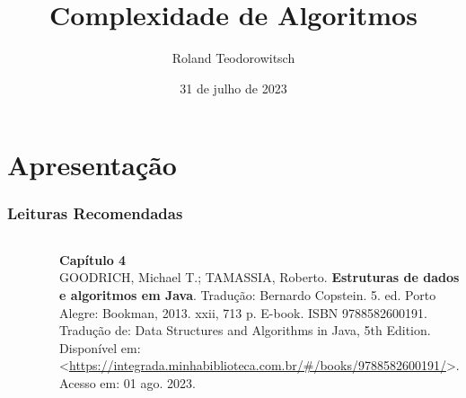 \documentclass[aspectratio=169]{beamer}
\title[\sc{Complexidade de Algoritmos}]{Complexidade de Algoritmos}
\author[Roland Teodorowitsch]{Roland Teodorowitsch}
\institute[ALEST I - EP - PUCRS]{Algoritmos e Estruturas de Dados I - Escola Politécnica - PUCRS}
\date{31 de julho de 2023}
\begin{document}
\justifying

\begin{frame}
	\titlepage
\end{frame}

\section{Apresentação}

\begin{frame}\frametitle{Leituras Recomendadas}

\begin{columns}[T]
\begin{column}{0.15\linewidth}
\vspace{-3mm}
\begin{figure}[h]
	\centering
	\includegraphics[height=0.3\paperheight]{pucrs-ec-poo-unidade_01-complexidade_de_algoritmos-laminas-livro_goodrich.jpg}
\end{figure}
\end{column}
\begin{column}{0.85\linewidth}
\vspace{3mm}
\textbf{Capítulo 4}\\
\scriptsize{GOODRICH, Michael T.; TAMASSIA, Roberto. \textbf{Estruturas de dados e algoritmos em Java}. Tradução: Bernardo Copstein. 5. ed. Porto Alegre: Bookman, 2013. xxii, 713 p. E-book. ISBN 9788582600191. Tradução de: Data Structures and Algorithms in Java, 5th Edition. Disponível em: \textless{}\url{https://integrada.minhabiblioteca.com.br/\#/books/9788582600191/}\textgreater{}. Acesso em: 01 ago. 2023.}
\end{column}
\end{columns}

\vspace{5mm}


\end{frame}
\end{document}
